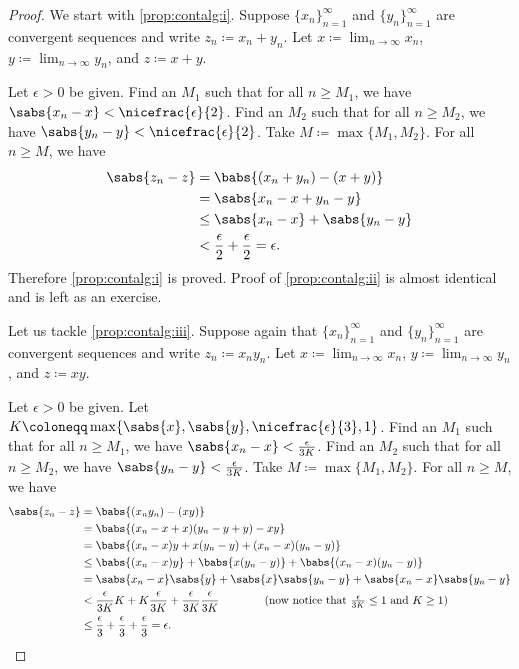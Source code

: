 \begin{proof}
We start with \ref{prop:contalg:i}.
Suppose $\{ x_n \}_{n=1}^\infty$ and $\{ y_n \}_{n=1}^\infty$ are convergent sequences and
write $z_n \coloneqq x_n + y_n$.  Let $x \coloneqq \lim_{n\to\infty} x_n$,
$y \coloneqq \lim_{n\to\infty} y_n$, and $z \coloneqq x+y$.

Let $\epsilon > 0$ be given.  
Find an $M_1$ such that for all $n \geq M_1$,
we have
$\sabs{x_n - x} < \nicefrac{\epsilon}{2}$.  
Find an $M_2$ such that for all $n \geq M_2$,
we have
$\sabs{y_n - y} < \nicefrac{\epsilon}{2}$.  Take $M \coloneqq \max \{ M_1, M_2 \}$.
For all $n \geq M$, we have
\begin{equation*}
\begin{split}
\sabs{z_n - z} &=
\babs{(x_n+y_n) - (x+y)} \\
& =
\sabs{x_n-x + y_n-y} \\
& \leq
\sabs{x_n-x} + \sabs{y_n-y} \\
& <
\frac{\epsilon}{2} +
\frac{\epsilon}{2}
= \epsilon.
\end{split}
\end{equation*}
Therefore \ref{prop:contalg:i} is proved.
Proof of \ref{prop:contalg:ii} is almost identical and is left as an
exercise.

Let us tackle 
\ref{prop:contalg:iii}.
Suppose again that $\{ x_n \}_{n=1}^\infty$ and $\{ y_n \}_{n=1}^\infty$ are convergent sequences and
write $z_n \coloneqq x_n y_n$.  Let $x \coloneqq \lim_{n\to\infty} x_n$,
$y \coloneqq \lim_{n\to\infty} y_n$, and $z \coloneqq xy$.

Let $\epsilon > 0$ be given.
Let $K \coloneqq \max\{ \sabs{x}, \sabs{y}, \nicefrac{\epsilon}{3} , 1 \}$.
Find an $M_1$ such that for all $n \geq M_1$,
we have
$\sabs{x_n - x} < \frac{\epsilon}{3K}$.
Find an $M_2$ such that for all $n \geq M_2$,
we have
$\sabs{y_n - y} < \frac{\epsilon}{3K}$.  Take $M \coloneqq \max \{ M_1, M_2 \}$.
For all $n \geq M$, we have
\begin{equation*}
\begin{split}
\sabs{z_n - z} &=
\babs{(x_ny_n) - (xy)} \\
& =
\babs{(x_n-x+x)(y_n-y+y) - xy} \\
& =
\babs{(x_n-x)y + x(y_n-y) +(x_n-x)(y_n-y)} \\
& \leq
\babs{(x_n-x)y} + \babs{x(y_n - y)} +
\babs{(x_n-x)(y_n-y)} \\
& =
\sabs{x_n -x}\sabs{y} + 
\sabs{x}\sabs{y_n -y} + 
\sabs{x_n -x}\sabs{y_n -y}
\\
& <
\frac{\epsilon}{3K} K + 
K \frac{\epsilon}{3K} + 
\frac{\epsilon}{3K}
\frac{\epsilon}{3K}
\qquad \qquad \text{(now notice that } \tfrac{\epsilon}{3K} \leq 1
\text{ and }
K \geq 1\text{)}
\\
& \leq
\frac{\epsilon}{3} + \frac{\epsilon}{3} + \frac{\epsilon}{3}
 = \epsilon .
\end{split}
\end{equation*}


\end{proof}
